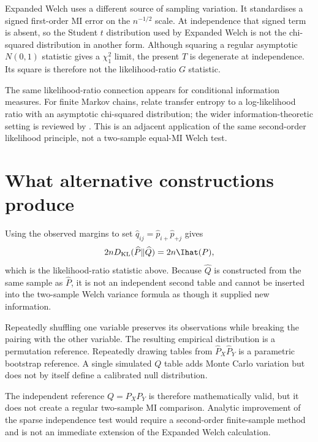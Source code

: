 Expanded Welch uses a different source of sampling variation. It
standardises a signed first-order MI error on the $n^{-1/2}$ scale. At
independence that signed term is absent, so the Student \(t\) distribution
used by Expanded Welch is not the chi-squared distribution in another form.
Although squaring a regular asymptotic \(N(0,1)\) statistic gives a
\(\chi^2_1\) limit, the present \(T\) is degenerate at independence. Its
square is therefore not the likelihood-ratio \(G\) statistic.

The same likelihood-ratio connection appears for conditional information
measures. For finite Markov chains, \citet{barnett2012} relate transfer entropy
to a log-likelihood ratio with an asymptotic chi-squared distribution; the wider
information-theoretic setting is reviewed by \citet{bossomaier2016}. This is an
adjacent application of the same second-order likelihood principle, not a
two-sample equal-MI Welch test.

\section{What alternative constructions produce}

Using the observed margins to set
$\widehat q_{ij}=\widehat p_{i+}\widehat p_{+j}$ gives
\begin{equation}
  2nD_{\mathrm{KL}}(\widehat P\Vert\widehat Q)
  =2n\Ihat(P),
\end{equation}
which is the likelihood-ratio statistic above.
Because $\widehat Q$ is constructed from the same sample as $\widehat P$, it
is not an independent second table and cannot be inserted into the two-sample
Welch variance formula as though it supplied new information.

Repeatedly shuffling one variable preserves its observations while breaking
the pairing with the other variable. The resulting empirical distribution is
a permutation reference. Repeatedly drawing tables from
$\widehat P_X\widehat P_Y$ is a parametric bootstrap reference. A single
simulated $Q$ table adds Monte Carlo variation but does not by itself define
a calibrated null distribution.

The independent reference $Q=P_XP_Y$ is therefore mathematically valid, but
it does not create a regular two-sample MI comparison. Analytic improvement of
the sparse independence test would require a second-order finite-sample
method and is not an immediate extension of the Expanded Welch calculation.
